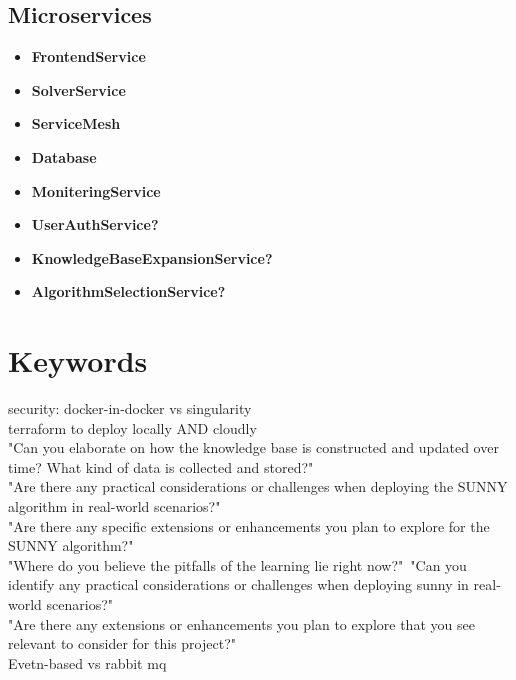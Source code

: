 \documentclass[12pt]{article}
\begin{document}
\subsection{Microservices}
\begin{itemize}
    \item \textbf{FrontendService}
    \item \textbf{SolverService}
    \item \textbf{ServiceMesh}
    \item \textbf{Database}
    \item \textbf{MoniteringService}
    \item \textbf{UserAuthService?}
    \item \textbf{KnowledgeBaseExpansionService?}
    \item \textbf{AlgorithmSelectionService?}
\end{itemize}

\section{Keywords}
security: docker-in-docker vs singularity\\
terraform to deploy locally AND cloudly\\
"Can you elaborate on how the knowledge base is constructed and updated over time? What kind of data is collected and stored?"\\
"Are there any practical considerations or challenges when deploying the SUNNY algorithm in real-world scenarios?"\\
"Are there any specific extensions or enhancements you plan to explore for the SUNNY algorithm?"\\
"Where do you believe the pitfalls of the learning lie right now?"\
"Can you identify any practical considerations or challenges when deploying sunny in real-world scenarios?"\\
"Are there any extensions or enhancements you plan to explore that you see relevant to consider for this project?"\\
Evetn-based vs rabbit mq




\end{document}
